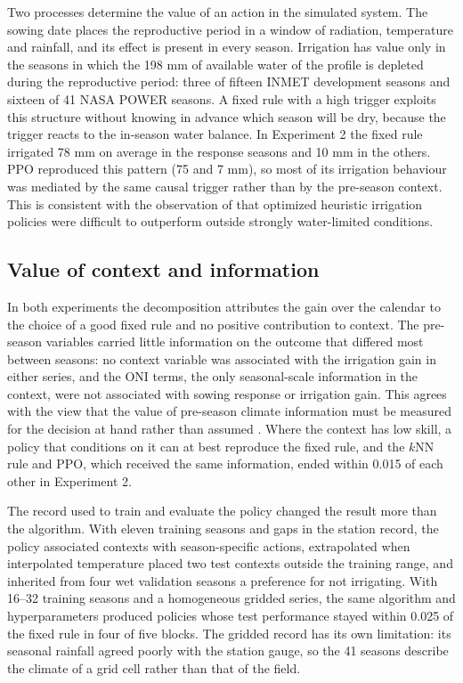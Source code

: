 \documentclass[times,final,authoryear]{elsarticle}
\begin{document}
Two processes determine the value of an action in the simulated system. The sowing date places the reproductive period in a window of radiation, temperature and rainfall, and its effect is present in every season. Irrigation has value only in the seasons in which the 198 mm of available water of the profile is depleted during the reproductive period: three of fifteen INMET development seasons and sixteen of 41 NASA POWER seasons. A fixed rule with a high trigger exploits this structure without knowing in advance which season will be dry, because the trigger reacts to the in-season water balance. In Experiment 2 the fixed rule irrigated 78 mm on average in the response seasons and 10 mm in the others. PPO reproduced this pattern (75 and 7 mm), so most of its irrigation behaviour was mediated by the same causal trigger rather than by the pre-season context. This is consistent with the observation of \citet{kelly2024assessing} that optimized heuristic irrigation policies were difficult to outperform outside strongly water-limited conditions.

\subsection{Value of context and information}
\label{subdisc_information}

In both experiments the decomposition attributes the gain over the calendar to the choice of a good fixed rule and no positive contribution to context. The pre-season variables carried little information on the outcome that differed most between seasons: no context variable was associated with the irrigation gain in either series, and the ONI terms, the only seasonal-scale information in the context, were not associated with sowing response or irrigation gain. This agrees with the view that the value of pre-season climate information must be measured for the decision at hand rather than assumed \citep{hansen2002climate}. Where the context has low skill, a policy that conditions on it can at best reproduce the fixed rule, and the $k$NN rule and PPO, which received the same information, ended within 0.015 of each other in Experiment 2.

The record used to train and evaluate the policy changed the result more than the algorithm. With eleven training seasons and gaps in the station record, the policy associated contexts with season-specific actions, extrapolated when interpolated temperature placed two test contexts outside the training range, and inherited from four wet validation seasons a preference for not irrigating. With 16--32 training seasons and a homogeneous gridded series, the same algorithm and hyperparameters produced policies whose test performance stayed within 0.025 of the fixed rule in four of five blocks. The gridded record has its own limitation: its seasonal rainfall agreed poorly with the station gauge, so the 41 seasons describe the climate of a grid cell rather than that of the field.
\end{document}
